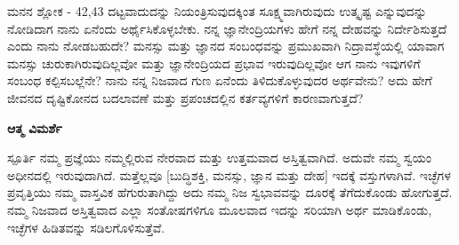 \newpage
\begin{mananam}{\mananamfont ಮನನ ಶ್ಲೋಕ - \textenglish{42,43}}
\footnotesize \mananamtext ದಟ್ಟವಾದುದನ್ನು ನಿಯಂತ್ರಿಸುವುದಕ್ಕಿಂತ ಸೂಕ್ಷ್ಮವಾಗಿರುವುದು ಉತ್ಕೃಷ್ಟ ಎನ್ನುವುದನ್ನು ನೋಡಿದಾಗ ನಾನು ಏನೆಂದು ಅರ್ಥೈಸಿಕೊಳ್ಳಬೇಕು. ನನ್ನ ಜ್ಞಾನೇಂದ್ರಿಯಗಳು ಹೇಗೆ ನನ್ನ ದೇಹವನ್ನು ನಿರ್ದೇಶಿಸುತ್ತದೆ ಎಂದು ನಾನು ನೋಡಬಹುದೇ? ಮನಸ್ಸು ಮತ್ತು ಜ್ಞಾನದ ಸಂಬಂಧವನ್ನು ಪ್ರಮುಖವಾಗಿ ನಿದ್ರಾವಸ್ಥೆಯಲ್ಲಿ ಯಾವಾಗ ಮನಸ್ಸು ಚುರುಕಾಗಿರುವುದಿಲ್ಲವೋ ಮತ್ತು ಜ್ಞಾನೇಂದ್ರಿಯದ ಪ್ರಭಾವ  ಇರುವುದಿಲ್ಲವೋ ಆಗ ನಾನು ಇವುಗಳಿಗೆ ಸಂಬಂಧ ಕಲ್ಪಿಸಬಲ್ಲೆನೇ? ನಾನು ನನ್ನ ನಿಜವಾದ ಗುಣ ಏನೆಂದು ತಿಳಿದುಕೊಳ್ಳುವುದರ ಅರ್ಥವೇನು? ಅದು ಹೇಗೆ ಜೀವನದ ದೃಷ್ಟಿಕೋನದ ಬದಲಾವಣೆ ಮತ್ತು ಪ್ರಪಂಚದಲ್ಲಿನ ಕರ್ತವ್ಯಗಳಿಗೆ ಕಾರಣವಾಗುತ್ತದೆ?
\end{mananam}
\WritingHand\enspace\textbf{ಆತ್ಮ ವಿಮರ್ಶೆ}\\
\begin{inspiration}{\mananamfont ಸ್ಪೂರ್ತಿ}
\footnotesize \mananamtext ನಮ್ಮ ಪ್ರಜ್ಞೆಯು ನಮ್ಮಲ್ಲಿರುವ ನೇರವಾದ ಮತ್ತು ಉತ್ತಮವಾದ ಅಸ್ತಿತ್ವವಾಗಿದೆ. ಅದುವೇ ನಮ್ಮ ಸ್ವಯಂ ಅಧೀನದಲ್ಲಿ ಇರುವುದಾಗಿದೆ. ಮತ್ತೆಲ್ಲವೂ [ಬುದ್ಧಿಶಕ್ತಿ, ಮನಸ್ಸು, ಜ್ಞಾನ ಮತ್ತು ದೇಹ] ಇದಕ್ಕೆ ವಸ್ತುಗಳಾಗಿವೆ. ಇಚ್ಛೆಗಳ ಪ್ರವೃತ್ತಿಯು ನಮ್ಮ ವಾಸ್ತವಿಕ ಹೆಗುರುತಾಗಿದ್ದು ಅದು ನಮ್ಮ ನಿಜ ಸ್ವಭಾವವನ್ನು ದೂರಕ್ಕೆ ತೆಗೆದುಕೊಂಡು ಹೋಗುತ್ತದೆ. ನಮ್ಮ ನಿಜವಾದ ಅಸ್ತಿತ್ವವಾದ ಎಲ್ಲಾ ಸಂತೋಷಗಳಿಗೂ ಮೂಲವಾದ ಇದನ್ನು ಸರಿಯಾಗಿ ಅರ್ಥ ಮಾಡಿಕೊಂಡು, ಇಚ್ಛೆಗಳ ಹಿಡಿತವನ್ನು ಸಡಿಲಗೊಳಿಸುತ್ತೆವೆ.
\end{inspiration}
\newpage


